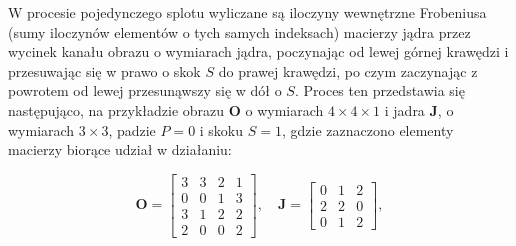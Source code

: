 \documentclass[pl,12pt]{aghdpl}
\begin{document}
W procesie pojedynczego splotu wyliczane są iloczyny wewnętrzne Frobeniusa
(sumy iloczynów elementów o tych samych indeksach) macierzy
jądra przez wycinek kanału obrazu o wymiarach jądra, poczynając od lewej górnej
krawędzi i przesuwając się w prawo o skok $S$ do prawej krawędzi, po czym zaczynając
z powrotem od lewej przesunąwszy się w dół o $S$. Proces ten przedstawia się
następująco, na przykładzie obrazu $\bm O$ o wymiarach $4 \times 4 \times 1$ i
jadra $\bm J$, o wymiarach $3 \times 3$, padzie $P = 0$ i skoku $S = 1$, gdzie
zaznaczono elementy macierzy biorące udział w działaniu:

\begin{equation}
  \bm O = \begin{bmatrix}
    3 & 3 & 2 & 1\\
    0 & 0 & 1 & 3\\
    3 & 1 & 2 & 2\\
    2 & 0 & 0 & 2
  \end{bmatrix},\quad
  \bm J = \begin{bmatrix}
    0 & 1 & 2\\
    2 & 2 & 0\\
    0 & 1 & 2
  \end{bmatrix},
\end{equation}
\tikzset{external/export=false}
\end{document}

